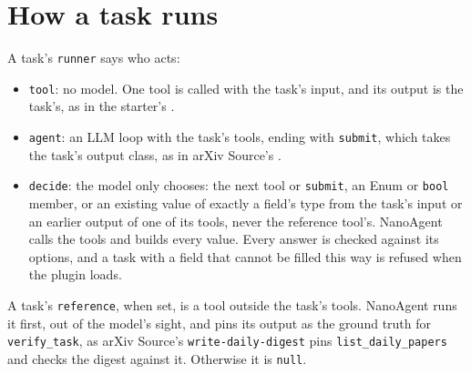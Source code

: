 \section{How a task runs}

A task's \texttt{runner} says who acts:

\begin{itemize}
  \item \texttt{tool}: no model. One tool is called with the task's input,
    and its output is the task's, as in the starter's
    .
  \item \texttt{agent}: an LLM loop with the task's tools, ending with
    \texttt{submit}, which takes the task's output class, as in arXiv
    Source's .
  \item \texttt{decide}: the model only chooses: the next tool or
    \texttt{submit}, an Enum or \texttt{bool} member, or an existing value
    of exactly a field's type from the task's input or an earlier output of
    one of its tools, never the reference tool's. NanoAgent calls the tools and builds every value. Every answer
    is checked against its options, and a task with a field that cannot be
    filled this way is refused when the plugin loads.
\end{itemize}

A task's \texttt{reference}, when set, is a tool outside the task's tools.
NanoAgent runs it first, out of the model's sight, and pins its output as the
ground truth for \texttt{verify\_task}, as arXiv Source's
\texttt{write-daily-digest} pins \texttt{list\_daily\_papers} and
 checks the digest against it. Otherwise
it is \texttt{null}.
